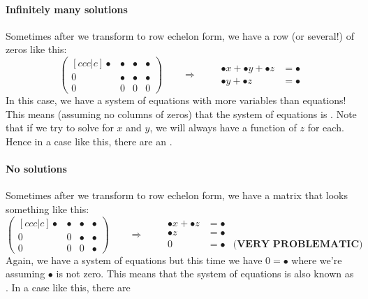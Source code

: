 \documentclass{ximera}
\begin{document}
\paragraph{Infinitely many solutions}

Sometimes after we transform to row echelon form, we have a row (or
several!) of zeros like this:
\[
  \begin{pmatrix}[ccc|c]
    \bullet &   \bullet & \bullet & \bullet  \\
    0 &   \bullet & \bullet & \bullet \\
    0& 0  & 0 & 0
  \end{pmatrix}
  \qquad\Longrightarrow\qquad
  \begin{aligned}
    \bullet x +  \bullet y + \bullet z &= \bullet \\
    \bullet y + \bullet z&= \bullet
  \end{aligned}
\]
In this case, we have a system of equations with more variables than
equations! This means (assuming no columns of zeros) that the system
of equations is . Note that if we try to solve
for $x$ and $y$, we will always have a function of $z$ for each. Hence
in a case like this, there are an .



\paragraph{No solutions}

Sometimes after we transform to row echelon form, we have a matrix
that looks something like this:
\[
  \begin{pmatrix}[ccc|c]
    \bullet &   \bullet & \bullet & \bullet  \\
    0 &   0 & \bullet & \bullet \\
    0& 0  &  0 & \bullet
  \end{pmatrix}
  \qquad\Longrightarrow\qquad
  \begin{aligned}
    \bullet x  + \bullet z &= \bullet & \\
    \bullet z&= \bullet & \\
    0 &=\bullet & \textbf{(VERY PROBLEMATIC)}
  \end{aligned}
\]
Again, we have a system of equations but this time we have $0 =
\bullet$ where we're assuming $\bullet$ is not zero.  This means that
the system of equations is  also known as
. In a case like this, there are 
\end{document}
